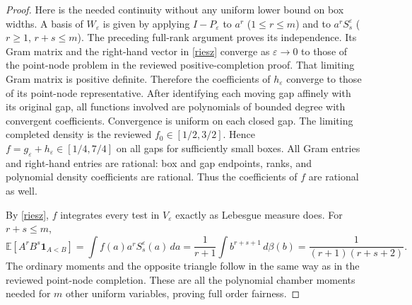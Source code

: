 \documentclass[11pt]{article}
\begin{document}
\begin{proof}
Here is the needed continuity without any uniform lower bound on box
widths. A basis of $W_\varepsilon$ is given by applying
$I-P_\varepsilon$ to $a^r$ ($1\le r\le m$) and to
$a^r S_s^\varepsilon$ ($r\ge1$, $r+s\le m$).
The preceding full-rank argument proves its independence. Its Gram
matrix and the right-hand vector in \eqref{riesz} converge as
$\varepsilon\to0$ to those of the point-node problem in the reviewed
positive-completion proof. That limiting Gram matrix is positive
definite. Therefore the coefficients of $h_\varepsilon$ converge to
those of its point-node representative. After identifying each moving
gap affinely with its original gap, all functions involved are
polynomials of bounded degree with convergent coefficients. Convergence
is uniform on each closed gap. The limiting completed density is the
reviewed $f_0\in[1/2,3/2]$. Hence
$f=g_\varepsilon+h_\varepsilon\in[1/4,7/4]$ on all gaps for sufficiently
small boxes. All Gram entries and right-hand entries are rational:
box and gap endpoints, ranks, and polynomial density coefficients are
rational. Thus the coefficients of $f$ are rational as well.

By \eqref{riesz}, $f$ integrates every test in $V_\varepsilon$ exactly
as Lebesgue measure does. For $r+s\le m$,
\[
 \mathbb E[A^rB^s\mathbf1_{A<B}]
 =\int f(a)a^rS_s^\varepsilon(a)\,da
 =\frac1{r+1}\int b^{r+s+1}\,d\beta(b)
 =\frac1{(r+1)(r+s+2)}.
\]
The ordinary moments and the opposite triangle follow in the same way
as in the reviewed point-node completion. These are all the polynomial
chamber moments needed for $m$ other uniform variables, proving full
order fairness.
\end{proof}
\end{document}
